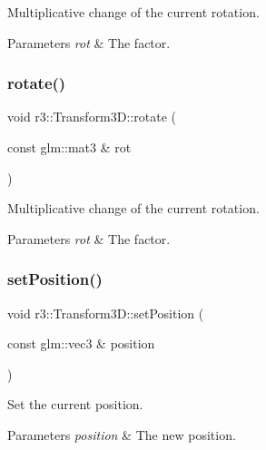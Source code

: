 Multiplicative change of the current rotation. 


\begin{DoxyParams}{Parameters}
{\em rot} & The factor. \\
\hline
\end{DoxyParams}
\mbox{\label{classr3_1_1_transform3_d_a802314a0dee26e4a5fb96666cd39741c}} 
\subsubsection{\texorpdfstring{rotate()}{rotate()}\hspace{0.1cm}{\footnotesize\ttfamily [2/2]}}
{\footnotesize\ttfamily void r3\+::\+Transform3\+D\+::rotate (\begin{DoxyParamCaption}\item[{const glm\+::mat3 \&}]{rot }\end{DoxyParamCaption})}



Multiplicative change of the current rotation. 


\begin{DoxyParams}{Parameters}
{\em rot} & The factor. \\
\hline
\end{DoxyParams}
\mbox{\label{classr3_1_1_transform3_d_a24bf42a0f16e38b66bd6a3ecf4f026c4}} 
\subsubsection{\texorpdfstring{set\+Position()}{setPosition()}\hspace{0.1cm}{\footnotesize\ttfamily [1/2]}}
{\footnotesize\ttfamily void r3\+::\+Transform3\+D\+::set\+Position (\begin{DoxyParamCaption}\item[{const glm\+::vec3 \&}]{position }\end{DoxyParamCaption})}



Set the current position. 


\begin{DoxyParams}{Parameters}
{\em position} & The new position. \\
\hline
\end{DoxyParams}
\mbox{\label{classr3_1_1_transform3_d_adae3a3bf01667c1c6c67d9a817d03a77}} 
